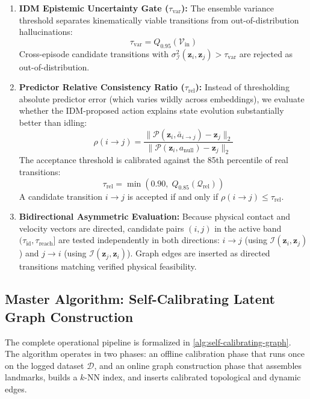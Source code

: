 \documentclass[11pt]{article}
\newcommand{\zv}{\mathbf{z}}
\begin{document}
\begin{enumerate}[leftmargin=1.4em,itemsep=3pt]
\item \textbf{IDM Epistemic Uncertainty Gate ($\tau_{\mathrm{var}}$):}
The ensemble variance threshold separates kinematically viable transitions from out-of-distribution hallucinations:
\begin{equation}
\tau_{\mathrm{var}} = Q_{0.95}(\mathcal{V}_{\text{in}})
\end{equation}
Cross-episode candidate transitions with $\sigma^2_{\mathcal{I}}(\zv_i, \zv_j) > \tau_{\mathrm{var}}$ are rejected as out-of-distribution.

\item \textbf{Predictor Relative Consistency Ratio ($\tau_{\mathrm{rel}}$):}
Instead of thresholding absolute predictor error (which varies wildly across embeddings), we evaluate whether the IDM-proposed action
explains state evolution substantially better than idling:
\begin{equation}
\rho(i \to j) = \frac{\|\mathcal{P}(\zv_i, \bar{a}_{i \to j}) - \zv_j\|_2}{\|\mathcal{P}(\zv_i, a_{\mathrm{null}}) - \zv_j\|_2}
\end{equation}
The acceptance threshold is calibrated against the 85th percentile of real transitions:
\begin{equation}
\tau_{\mathrm{rel}} = \min\left(0.90, \; Q_{0.85}(\mathcal{Q}_{\text{rel}})\right)
\end{equation}
A candidate transition $i \to j$ is accepted if and only if $\rho(i \to j) \le \tau_{\mathrm{rel}}$.

\item \textbf{Bidirectional Asymmetric Evaluation:}
Because physical contact and velocity vectors are directed, candidate pairs $(i, j)$ in the active band
$(\tau_{\mathrm{id}}, \tau_{\mathrm{reach}}]$ are tested independently in both directions:
$i \to j$ (using $\mathcal{I}(\zv_i, \zv_j)$) and $j \to i$ (using $\mathcal{I}(\zv_j, \zv_i)$). Graph edges are inserted
as directed transitions matching verified physical feasibility.
\end{enumerate}

\subsection{Master Algorithm: Self-Calibrating Latent Graph Construction}
\label{sec:master-algorithm}

The complete operational pipeline is formalized in \cref{alg:self-calibrating-graph}. The algorithm operates in two phases:
an offline calibration phase that runs once on the logged dataset $\mathcal{D}$, and an online graph construction phase that
assembles landmarks, builds a $k$-NN index, and inserts calibrated topological and dynamic edges.
\end{document}
